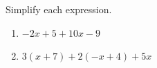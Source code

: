 Simplify each expression.
\begin{enumerate}
\item[(a)] $-2x+5+10x-9$
\item[(b)] $3(x+7)+2(-x+4)+5x$
\end{enumerate}
